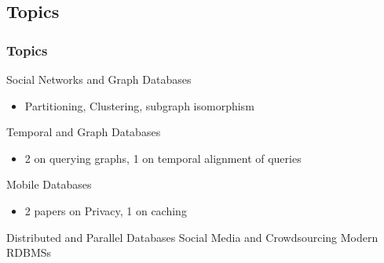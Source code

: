\subsection{Topics}
\begin{frame}[red] %
\frametitle{Topics} 

      \begin{itemize} 
      \ritem Social Networks and Graph Databases
      \begin{itemize} 
      \item Partitioning, Clustering, subgraph isomorphism
      \end{itemize}
      \ritem Temporal and Graph Databases
      \begin{itemize} 
      \item 2 on querying graphs, 1 on temporal alignment of queries
      \end{itemize} %
      \ritem Mobile Databases
      \begin{itemize} 
      \item 2 papers on Privacy, 1 on caching
      \end{itemize}
      \gitem Distributed and Parallel Databases
      \gitem Social Media and Crowdsourcing
      \gitem Modern RDBMSs
      \end{itemize}
\end{frame}





